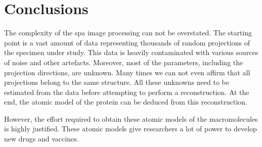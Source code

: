 \documentclass[../main.tex]{subfiles}
\begin{document}
\section{Conclusions}

The complexity of the \gls{spa} image processing can not be overstated. The starting point is a vast amount of data representing thousands of random projections of the specimen under study. This data is heavily contaminated with various sources of noise and other artefacts. Moreover, most of the parameters, including the projection directions, are unknown. Many times we can not even affirm that all projections belong to the same structure. All these unknowns need to be estimated from the data before attempting to perform a reconstruction. At the end, the atomic model of the protein can be deduced from this reconstruction. 

However, the effort required to obtain these atomic models of the macromolecules is highly justified. These atomic models give researchers a lot of power to develop new drugs and vaccines.
\end{document}
